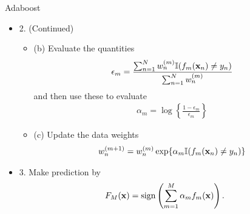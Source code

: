 \documentclass{beamer}
\def\bfx{{\bf x}}
\begin{document}
                     \begin{frame}{Adaboost}%
                      \begin{itemize}
                      \item 2. (Continued)
                      \begin{itemize}
                        \item (b) Evaluate the quantities
                       \begin{align}\label{Em}
                       \epsilon_m = \frac{\sum^N_{n=1} w_n^{(m)}\mathbb{I}(f_m(\bfx_n)\ne y_n)}{\sum^N_{n=1} w_n^{(m)}}
                       \end{align}
                       and then use these to evaluate 
                       \begin{align}\label{alpham}
                       \alpha_m = \log \left\{\frac{1-\epsilon_m}{\epsilon_m} \right\}
                       \end{align}
                       \item (c) Update the data weights
                       \begin{align}\label{wn}
                       w_n^{(m+1)} = w_n^{(m)} \exp\{\alpha_m \mathbb{I}(f_m(\bfx_n)\ne y_n) \}
                       \end{align}
                      \end{itemize}                     
                      \item 3. Make prediction by 
                      \begin{align}\label{Ym}
                      F_M(\bfx)=\mathrm{sign}\left( \sum^M_{m=1} \alpha_m f_m(\bfx) \right).
                      \end{align}
                      \end{itemize}

                     \end{frame}
\end{document}
